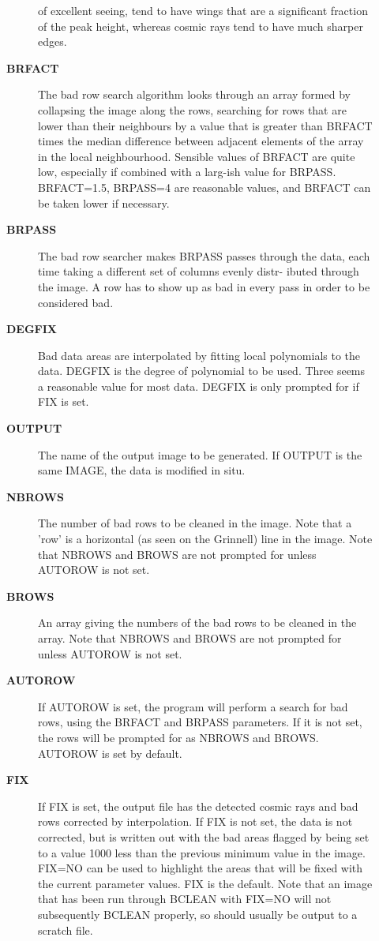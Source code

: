 \begin{description}
\begin{description}
 of excellent seeing, tend to have wings that are a
 significant fraction of the peak height, whereas cosmic
 rays tend to have much sharper edges.
\item [{\bf BRFACT}]
 The bad row search algorithm looks through an array formed
 by collapsing the image along the rows, searching for rows
 that are lower than their neighbours by a value that is
 greater than BRFACT times the median difference between
 adjacent elements of the array in the local neighbourhood.
 Sensible values of BRFACT are quite low, especially if
 combined with a larg-ish value for BRPASS.  BRFACT=1.5,
 BRPASS=4 are reasonable values, and BRFACT can be taken
 lower if necessary.
\item [{\bf BRPASS}]
 The bad row searcher makes BRPASS passes through the data,
 each time taking a different set of columns evenly distr-
 ibuted through the image.  A row has to show up as bad in
 every pass in order to be considered bad.
\item [{\bf DEGFIX}]
 Bad data areas are interpolated by fitting local polynomials
 to the data.  DEGFIX is the degree of polynomial to be used.
 Three seems a reasonable value for most data.  DEGFIX is only
 prompted for if FIX is set.
\item [{\bf OUTPUT}]
 The name of the output image to be generated.
 If OUTPUT is the same IMAGE, the data is modified in situ.
\item [{\bf NBROWS}]
 The number of bad rows to be cleaned in the image.
 Note that a 'row' is a horizontal (as seen on the Grinnell)
 line in the image.  Note that NBROWS and BROWS are not
 prompted for unless AUTOROW is not set.
\item [{\bf BROWS}]
 An array giving the numbers of the bad rows to be
 cleaned in the array.  Note that NBROWS and BROWS are not
 prompted for unless AUTOROW is not set.
\item [{\bf AUTOROW}]
 If AUTOROW is set, the program will perform a search
 for bad rows, using the BRFACT and BRPASS parameters.  If it
 is not set, the rows will be prompted for as NBROWS and
 BROWS.  AUTOROW is set by default.
\item [{\bf FIX}]
 If FIX is set, the output file has the detected cosmic
 rays and bad rows corrected by interpolation.  If FIX is not
 set, the data is not corrected, but is written out with
 the bad areas flagged by being set to a value 1000 less than
 the previous minimum value in the image.  FIX=NO can be used
 to highlight the areas that will be fixed with the current
 parameter values.  FIX is the default.  Note that an image
 that has been run through BCLEAN with FIX=NO will
 not subsequently BCLEAN properly, so should usually be output
 to a scratch file.


\end{description}
\end{description}
